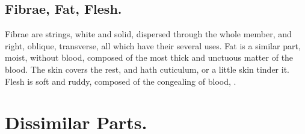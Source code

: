 {\subsection{Fibrae, Fat, Flesh.}
Fibrae are strings, white and solid, dispersed
through the whole member, and right, oblique, transverse, all which
have their several uses. Fat is a similar part, moist, without blood,
composed of the most thick and unctuous matter of the blood. The
skin covers the rest, and hath cuticulum, or a little skin tinder
it. Flesh is soft and ruddy, composed of the congealing of blood, \etc{}.

\section{Dissimilar Parts.}

}
